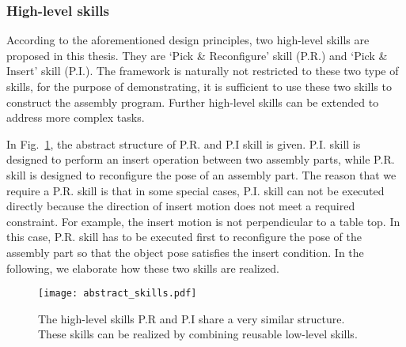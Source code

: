 \subsubsection{High-level skills}
According to the aforementioned design principles, two high-level skills are proposed in this thesis.  They are `Pick \& Reconfigure' skill  (P.R.) and `Pick \& Insert' skill (P.I.). The framework is naturally not restricted to these two type of skills, for the purpose of demonstrating, it is sufficient to use these two skills to construct the assembly program. Further high-level skills can be extended to address more complex tasks. 

In Fig.~\ref{fig:abstract_skill}, the abstract structure of P.R. and P.I skill is given. P.I. skill is designed to perform an insert operation between two assembly parts, while P.R. skill is designed to reconfigure the pose of an assembly part. The reason that we require a P.R. skill is  that in some special cases, P.I. skill can not be executed directly because the direction of insert motion does not meet a required constraint. For example, the insert motion is not perpendicular to a table top. In this case, P.R. skill has to be executed first to reconfigure the pose of the assembly part so that the object pose satisfies the insert condition. In the following, we elaborate how these two skills are realized. 

\begin{figure}[!htbp]
\centering
\texttt{[image: abstract\_skills.pdf]}
\captionsetup{justification=raggedright}
\caption{The high-level skills P.R and P.I share a very similar structure. These skills can be realized by  combining reusable low-level skills.}
\label{fig:abstract_skill}
\end{figure}


